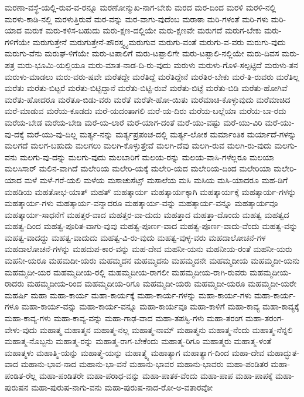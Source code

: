 {ಮರಣಾ-ವಸ್ಥೆ-ಯಲ್ಲಿ-ರುವ-ವ-ರನ್ನೂ
ಮರಣೋನ್ಮುಖ-ನಾಗ-ಬೇಕು
ಮರದ
ಮರ-ದಿಂದ
ಮರಳಿ
ಮರಳಿ-ನಲ್ಲಿ
ಮರಳು-ಕಾಡಿ-ನಲ್ಲಿ
ಮರಳುತ್ತಿರುವೆ
ಮರ-ವನ್ನು
ಮರ-ವಾಗು-ವುದೆಂಬ
ಮರಾಠಾ
ಮರಿ-ಗಳಂತೆ
ಮರಿ-ಗಳು
ಮರಿ-ಯಾದ
ಮರುಕ
ಮರು-ಕಳಿಸ-ಬಹುದು
ಮರು-ಕ್ಷಣ-ದಲ್ಲಿಯೇ
ಮರು-ಕ್ಷಣವೇ
ಮರುಗದೆ
ಮರುಗ-ಬೇಕು
ಮರು-ಗಳಿಗೆಯೇ
ಮರುಗುತ್ತೇನೆ
ಮರುಗುತ್ತೇನೆ-ಪೌರಸ್ತ್ಯ್ಯ
ಮರುಗುವ
ಮರುಗು-ವಂತೆ
ಮರುಗು-ವ-ವರು
ಮರುಗು-ವುದು
ಮರುಗು-ವೆನು
ಮರುಘ-ಳಿಗೆಯೇ
ಮರು-ಟಪಾಲಿಗೆ
ಮರು-ಟಪ್ಪಾಲಿಗೇ
ಮರು-ಟಪ್ಪಾಲಿ-ನಲ್ಲಿಯೇ
ಮರು-ದಿವಸ
ಮರು-ಪತ್ರ
ಮರು-ಭೂಮಿ-ಯಲ್ಲಿಯೂ
ಮರು-ಮಾತ-ನಾಡ-ದಿ-ರು-ವುದು
ಮರುಳು
ಮರುಳು-ಗೊಳಿ-ಸಲ್ಪಟ್ಟಿದೆ
ಮರುಳು-ತನ
ಮರುಳು-ಮಾಡಲು
ಮರು-ವರು-ಷವೇ
ಮರೆತದ್ದೇ
ಮರೆತಿದ್ದೆ
ಮರೆತಿದ್ದೇನೆ
ಮರೆತಿರ-ಬೇಕು
ಮರೆ-ತಿ-ರುವರು
ಮರೆತಿಲ್ಲ
ಮರೆತು
ಮರೆತು-ಬಿಟ್ಟರೆ
ಮರೆತು-ಬಿಟ್ಟಿದ್ದಾನೆ
ಮರೆತು-ಬಿಟ್ಟಿ-ರುವೆ
ಮರೆತು-ಬಿಟ್ಟೆ
ಮರೆತು-ಬಿಡಿ
ಮರೆತು-ಹೋಗಿವೆ
ಮರೆತು-ಹೋದರೂ
ಮರೆತೂ-ಬಿಡು-ವರು
ಮರೆತೆ
ಮರೆತೇ-ಹೋ-ಯಿತು
ಮರೆಮಾಚಿ-ಕೊಳ್ಳುವುದು
ಮರೆಮಾಚಿದ
ಮರೆ-ಮಾಡುವ
ಮರೆಯ-ಕೂಡದು
ಮರೆ-ಯದಂತಾಗಲಿ
ಮರೆ-ಯ-ದಿರು
ಮರೆಯ-ಬಲ್ಲೆಯಾ
ಮರೆಯ-ಬಾ-ರದು
ಮರೆಯ-ಬೇಡ
ಮರೆಯ-ಬೇಡಿ
ಮರೆ-ಯ-ಲಾರೆ
ಮರೆ-ಯಾಗ-ದಂತೆ
ಮರೆ-ಯು-ವಷ್ಟು
ಮರೆ-ಯು-ವಿರಿ
ಮರೆ-ಯು-ವು-ದಕ್ಕೆ
ಮರೆ-ಯು-ವು-ದಿಲ್ಲ
ಮರ್ತ್ಯ-ನನ್ನು
ಮರ್ತ್ಯಪ್ರಪಂಚ-ದಲ್ಲಿ
ಮರ್ತ್ಯ-ಲೋಕ
ಮರ್ಮಾಂತಿಕ
ಮರ್ಯಾದೆ-ಗಳನ್ನು
ಮಲಗದೆ
ಮಲಗ-ಬಹುದು
ಮಲಗಲು
ಮಲಗಿ-ಕೊಳ್ಳುತ್ತೇವೆ
ಮಲಗಿ-ದೆವು
ಮಲಗಿ-ರುವ
ಮಲಗಿ-ರು-ವುದು
ಮಲಗು-ವನು
ಮಲಗು-ವು-ದನ್ನು
ಮಲಗು-ವುದು
ಮಲಬಾರಿಗೆ
ಮಲಯ-ರನ್ನು
ಮಲಯ-ವಾಸಿ-ಗಳೆಲ್ಲರೂ
ಮಲಯಾ
ಮಲಸಿಸಾರ್
ಮಲಿನ-ವಾಗಿದೆ
ಮಲೇರಿಯ
ಮಲೇರಿ-ಯಕ್ಕೆ
ಮಲೇರಿ-ಯದ
ಮಲೇರಿಯ-ದಿಂದ
ಮಲೇರಿಯಾ
ಮಲೇರಿ-ಯಾದ
ಮಳೆ
ಮಳೆ-ಗರೆ-ಯಲಿ
ಮಳೆಯ
ಮಸಾಚುಸೆಟ್ಸ್
ಮಸಾಲೆಯ
ಮಸಿ
ಮಸಿಯ
ಮಸಿ-ಯಾದರೂ
ಮಹ-ಡಿಗೆ
ಮಹಡಿಯ
ಮಹತೋಭ-ಯಾತ್
ಮಹತ್
ಮಹತ್ಕಾರ್ಯ
ಮಹತ್ಕಾರ್ಯಕ್ಕಾಗಿ
ಮಹತ್ಕಾರ್ಯಕ್ಕೆ
ಮಹತ್ಕಾರ್ಯ-ಗಳನ್ನು
ಮಹತ್ಕಾರ್ಯ-ಗಳು
ಮಹತ್ಕಾರ್ಯ-ವನ್ನಾದರೂ
ಮಹತ್ಕಾರ್ಯ-ವನ್ನು
ಮಹತ್ಕಾರ್ಯ-ವನ್ನೂ
ಮಹತ್ಕಾರ್ಯವೂ
ಮಹತ್ಕಾರ್ಯ-ಸಾಧನೆಗೆ
ಮಹತ್ತರ-ವಾದ
ಮಹತ್ತರ-ವಾ-ದುದು
ಮಹತ್ತಾದ
ಮಹತ್ತಾ-ದೊಂದು
ಮಹತ್ವ
ಮಹತ್ವದ
ಮಹತ್ವ-ದಿಂದ
ಮಹತ್ವ-ಪೂರಿತ-ವಾಗು-ವುವು
ಮಹತ್ವ-ಪೂರ್ಣ-ವಾದ
ಮಹತ್ವ-ಪೂರ್ಣ-ವಾದು-ವೆಂದು
ಮಹತ್ವ-ವನ್ನು
ಮಹತ್ವ-ವಾದದ್ದು
ಮಹತ್ವ-ವಾದುದು
ಮಹತ್ವ-ವಿ-ರು-ವುದು
ಮಹತ್ವ-ವುಳ್ಳ-ವರು
ಮಹದಾಲೋಚನೆ-ಗಳ
ಮಹದಾಲೋಚನೆ-ಗಳನ್ನು
ಮಹದುಪ-ಕಾರ-ವನ್ನು
ಮಹ-ದೇವ
ಮಹನೀ-ಯನು
ಮಹನೀಯ-ರಂತೆ
ಮಹನೀ-ಯರು
ಮಹನೀ-ಯರೂ
ಮಹಮದೀ-ಯರು
ಮಹಮ್ಮದನ
ಮಹಮ್ಮದನು
ಮಹಮ್ಮದನೇ
ಮಹಮ್ಮದೀಯ
ಮಹಮ್ಮದೀ-ಯನು
ಮಹಮ್ಮದೀ-ಯರ
ಮಹಮ್ಮದೀಯ-ರಲ್ಲಿ
ಮಹಮ್ಮದೀಯ-ರಾಗಲೀ
ಮಹಮ್ಮದೀಯ-ರಾಗಿ-ರುವರು
ಮಹಮ್ಮದೀಯ-ರಾದರು
ಮಹಮ್ಮದೀಯ-ರಿಂದ
ಮಹಮ್ಮದೀಯ-ರಿಗೂ
ಮಹಮ್ಮದೀ-ಯರು
ಮಹಮ್ಮದೀ-ಯರೂ
ಮಹಮ್ಮದೀ-ಯರೇ
ಮಹರ್ಷಿ
ಮಹಾ
ಮಹಾ-ಕಾರ್ಯ
ಮಹಾ-ಕಾರ್ಯಕ್ಕೆ
ಮಹಾ-ಕಾರ್ಯ-ಗಳನ್ನು
ಮಹಾ-ಕಾರ್ಯ-ಗಳು
ಮಹಾ-ಕಾರ್ಯ-ಗಳೂ
ಮಹಾ-ಕಾರ್ಯ-ವನ್ನು
ಮಹಾ-ಕಾರ್ಯ-ವನ್ನೂ
ಮಹಾ-ಕಾರ್ಯವೂ
ಮಹಾ-ಕಾಳಿಗೆ
ಮಹಾ-ಕಾವ್ಯ
ಮಹಾ-ಕಾವ್ಯಕ್ಕೆ
ಮಹಾ-ಕಾವ್ಯ-ಗಳು
ಮಹಾ-ಕಾವ್ಯ-ವನ್ನು
ಮಹಾ-ಗಾಢ-ವಾದ
ಮಹಾ-ತಪಸ್ವಿ-ಗಳು
ಮಹಾ-ತರಂಗ
ಮಹಾ-ತರಂಗ-ವೇಳು-ವುದು
ಮಹಾತ್ಮ
ಮಹಾತ್ಮನ
ಮಹಾತ್ಮ-ನಲ್ಲ
ಮಹಾತ್ಮ-ನಾಮ್
ಮಹಾತ್ಮನು
ಮಹಾತ್ಮ-ನೆಂದು
ಮಹಾತ್ಮ-ನೆನ್ನಲಿ
ಮಹಾತ್ಮ-ನೊಬ್ಬನು
ಮಹಾತ್ಮ-ರನ್ನು
ಮಹಾತ್ಮ-ರಾಗ-ಬೇಕೆಂದು
ಮಹಾತ್ಮ-ರಿಗೂ
ಮಹಾತ್ಮರು
ಮಹಾತ್ಮ-ಳಂತೆ
ಮಹಾತ್ಮಳು
ಮಹಾತ್ಮಿ-ಯನ್ನು
ಮಹಾತ್ಮೆ-ಯನ್ನು
ಮಹಾತ್ಮ್ಯೆ
ಮಹಾತ್ಯಾಗ
ಮಹಾತ್ಯಾಗ-ದಿಂದ
ಮಹಾ-ದೇವ
ಮಹಾದ್ಭುತ-ವಾದ
ಮಹಾನು-ಭಾವ-ನಾದ
ಮಹಾನು-ಭಾ-ವನೆ
ಮಹಾನು-ಭಾವರ
ಮಹಾನು-ಭಾವರು
ಮಹಾ-ಪಂಡಿತರ
ಮಹಾ-ಪಂಡಿತ-ರೆಲ್ಲ
ಮಹಾ-ಪಂಡಿತರೇ
ಮಹಾ-ಪರಾಧ-ವನ್ನು
ಮಹಾ-ಪಾತಕ-ವೆಂದು
ಮಹಾ-ಪಾಪ
ಮಹಾ-ಪಾಪಕ್ಕೆ
ಮಹಾ-ಪುರುಷನ
ಮಹಾ-ಪುರುಷ-ನಾಗು-ವನು
ಮಹಾ-ಪುರುಷ-ನಾದ-ರೋ-ಅ-ವತಾರವೋ
}
